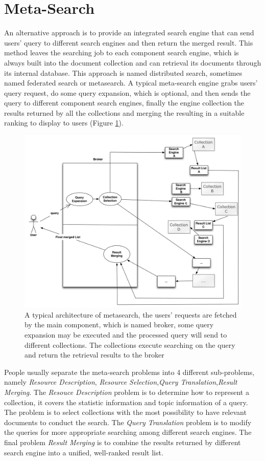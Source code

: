 \section{Meta-Search} 
An alternative approach is to provide an integrated search engine that can send users' query to different search engines and then return the merged result. This method leaves the searching job to each component search engine, which is always built into the document collection and can retrieval its documents through its internal database. This approach is named distributed search\cite{Callan2000}, sometimes named federated search\cite{Jacso2004} or metasearch. A typical meta-search engine grabs users' query request, do some query expansion, which is optional, and then sends the query to different component search engines, finally the engine collection the results returned by all the collections and merging the resulting in a suitable ranking to display to users (Figure \ref{fig:ms}).
 \begin{figure}[h!]
\includegraphics[width=12cm]{architecture.jpg} 
\caption{A typical architecture
of metasearch, the users' requests are fetched by the main component, which is
named broker, some query expansion may be executed and the processed query will
send to different collections. The collections execute searching on the query
and return the retrieval results to the broker \label{fig:ms}} 
\end{figure} 
People usually separate the meta-search problems into 4 different sub-problems, namely \textit{Resource Description}, \textit{Resource Selection},\textit{Query Translation},\textit{Result Merging}\cite{Si2003a}. The \textit{Resouce Description} problem is to determine how to represent a collection, it covers the statistic information and topic information of a query. The  problem is to select collections with the most possibility to have relevant documents to conduct the search. The \textit{Query Translation} problem is to modify the queries for more appropriate searching among different search engines. The final problem \textit{Result Merging} is to combine the results returned by different search engine into a unified, well-ranked result list.


